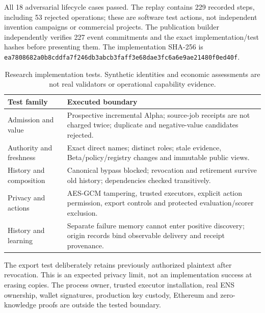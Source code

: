 All 18 adversarial lifecycle cases passed. The replay contains 229 recorded steps, including 53 rejected operations; these are software test actions, not independent invention campaigns or commercial projects. The publication builder independently verifies 227 event commitments and the exact implementation/test hashes before presenting them. The implementation SHA-256 is \nolinkurl{ea7808682a0b8cddfa7f246db3abcb3faff3e68dae3fc6a6e9ae21480f0ed40f}.
\begin{table}[htbp]\centering\small\begin{tabular}{p{.25\linewidth}p{.68\linewidth}}
\toprule
Test family & Executed boundary\\\midrule
Admission and value & Prospective incremental Alpha; source-job receipts are not charged twice; duplicate and negative-value candidates rejected.\\
Authority and freshness & Exact direct names; distinct roles; stale evidence, Beta/policy/registry changes and immutable public views.\\
History and composition & Canonical bypass blocked; revocation and retirement survive old history; dependencies checked transitively.\\
Privacy and actions & AES-GCM tampering, trusted executors, explicit action permission, export controls and protected evaluation/scorer exclusion.\\
History and learning & Separate failure memory cannot enter positive discovery; origin records bind observable delivery and receipt provenance.\\
\bottomrule\end{tabular}\caption{Research implementation tests. Synthetic identities and economic assessments are not real validators or operational capability evidence.}\end{table}
The export test deliberately retains previously authorized plaintext after revocation. This is an expected privacy limit, not an implementation success at erasing copies. The process owner, trusted executor installation, real ENS ownership, wallet signatures, production key custody, Ethereum and zero-knowledge proofs are outside the tested boundary.
